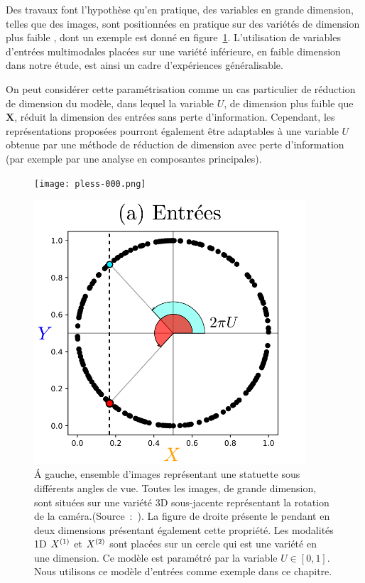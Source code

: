 \documentclass[../main]{subfiles}
\begin{document}
Des travaux font l'hypothèse qu'en pratique, des variables en grande dimension, telles que des images, sont positionnées en pratique sur des variétés de dimension plus faible \cite{Pless2009ASO}, dont un exemple est donné en figure~\ref{fig:U}. L'utilisation de variables d'entrées multimodales placées sur une variété inférieure, en faible dimension dans notre étude, est ainsi un cadre d'expériences généralisable.


On peut considérer cette paramétrisation comme un cas particulier de réduction de dimension du modèle, dans lequel la variable $U$, de dimension plus faible que $\mathbf{X}$, réduit la dimension des entrées sans perte d'information. 
Cependant, les représentations proposées pourront également être adaptables à une variable $U$ obtenue par une méthode de réduction de dimension avec perte d'information (par exemple par une analyse en composantes principales).

\begin{figure}
    \begin{minipage}{0.4\textwidth}
    \centering
    \texttt{[image: pless-000.png]}
    \end{minipage}
    \begin{minipage}{0.6\textwidth}
    \centering
    \includegraphics[width=0.9\textwidth]{2som_inp.pdf}
    \end{minipage}
    \caption{
        \'A gauche, ensemble d'images représentant une statuette sous différents angles de vue. Toutes les images, de grande dimension, sont situées sur une variété 3D sous-jacente représentant la rotation de la caméra.(Source~:~\cite{Pless2009ASO}).
       La figure de droite présente le pendant en deux dimensions présentant également cette propriété. Les modalités 1D $X^{({1})}$ et $X^{({2})}$ sont placées sur un cercle qui est une variété en une dimension. Ce modèle est paramétré par la variable $U \in [0,1]$. Nous utilisons ce modèle d'entrées comme exemple dans ce chapitre.
       \label{fig:U}}
\end{figure}
\end{document}
